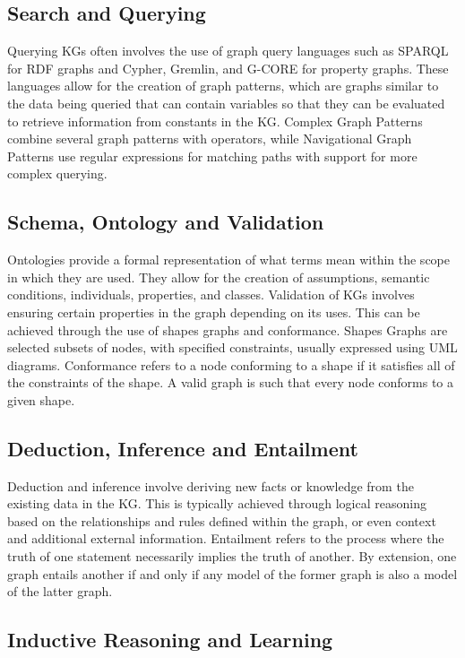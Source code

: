 \documentclass[11pt]{article} %
\begin{document}
\subsection{Search and Querying}

Querying KGs often involves the use of graph query languages such as SPARQL for RDF graphs and Cypher, Gremlin, and G-CORE \cite{KG21} for property graphs. These languages allow for the creation of graph patterns, which are graphs similar to the data being queried that can contain variables so that they can be evaluated to retrieve information from constants in the KG. Complex Graph Patterns combine several graph patterns with operators, while Navigational Graph Patterns use regular expressions for matching paths with support for more complex querying.

\subsection{Schema, Ontology and Validation}

Ontologies provide a formal representation of what terms mean within the scope in which they are used. They allow for the creation of assumptions, semantic conditions, individuals, properties, and classes. Validation of KGs involves ensuring certain properties in the graph depending on its uses. This can be achieved through the use of shapes graphs and conformance. Shapes Graphs are selected subsets of nodes, with specified constraints, usually expressed using UML diagrams. Conformance refers to a node conforming to a shape if it satisfies all of the constraints of the shape. A valid graph is such that every node conforms to a given shape.

\subsection{Deduction, Inference and Entailment}

Deduction and inference involve deriving new facts or knowledge from the existing data in the KG. This is typically achieved through logical reasoning based on the relationships and rules defined within the graph, or even context and additional external information. Entailment refers to the process where the truth of one statement necessarily implies the truth of another. By extension, one graph entails another if and only if any model of the former graph is also a model of the latter graph.

\subsection{Inductive Reasoning and Learning}
\end{document}
